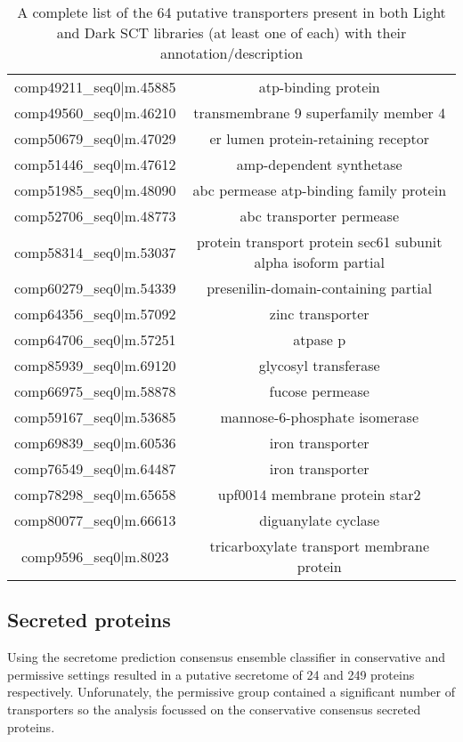 \begin{table}
\begin{tabular}{|c|c|}
comp49211\_seq0|m.45885&atp-binding protein\\
comp49560\_seq0|m.46210&transmembrane 9 superfamily member 4\\
comp50679\_seq0|m.47029&er lumen protein-retaining receptor\\
comp51446\_seq0|m.47612&amp-dependent synthetase\\			
comp51985\_seq0|m.48090&abc permease atp-binding family protein\\
comp52706\_seq0|m.48773&abc transporter permease\\
comp58314\_seq0|m.53037&protein transport protein sec61 subunit alpha isoform partial\\
comp60279\_seq0|m.54339&presenilin-domain-containing partial\\
comp64356\_seq0|m.57092&zinc transporter\\
comp64706\_seq0|m.57251&atpase p\\
comp85939\_seq0|m.69120&glycosyl transferase\\
comp66975\_seq0|m.58878&fucose permease\\
comp59167\_seq0|m.53685&mannose-6-phosphate isomerase\\
comp69839\_seq0|m.60536&iron transporter\\
comp76549\_seq0|m.64487&iron transporter\\
comp78298\_seq0|m.65658&upf0014 membrane protein star2\\
comp80077\_seq0|m.66613&diguanylate cyclase\\
comp9596\_seq0|m.8023&tricarboxylate transport membrane protein\\
        \hline
    \end{tabular}
    \caption[List of Transporters Present in Both Light and Dark SCT Libaries]{
        A complete list of the 64 putative transporters present in both Light and Dark 
    SCT libraries (at least one of each) with their annotation/description}
\end{table}

\subsection{Secreted proteins}

Using the secretome prediction consensus ensemble classifier in conservative
and permissive settings resulted in a putative secretome
of 24 and 249 proteins respectively.  Unforunately, the permissive
group contained a significant number of transporters so the analysis
focussed on the conservative consensus secreted proteins.

